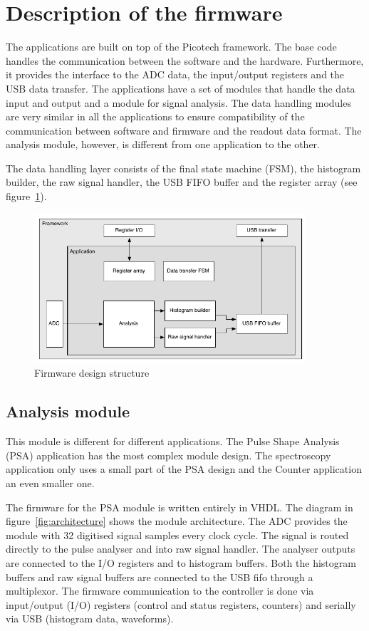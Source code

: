 \documentclass[12pt]{packages/mytustyle}  %
\begin{document}
\section{Description of the firmware}
The applications are built on top of the Picotech framework. The base code handles the communication between the software and the hardware. Furthermore, it provides the interface to the ADC data, the input/output registers and the USB data transfer. The applications have a set of modules that handle the data input and output and a module for signal analysis. The data handling modules are very similar in all the applications to ensure compatibility of the communication between software and firmware and the readout data format. The analysis module, however, is different from one application to the other. 

The data handling layer consists of the final state machine (FSM), the histogram builder, the raw signal handler, the USB FIFO buffer and the register array (see figure~\ref{fig:application}). 


\begin{figure}[!t]
\centering
\includegraphics[width=0.9\textwidth]{plots/application}
\caption{Firmware design structure}
\label{fig:application}
\end{figure}


\subsection{Analysis module}
\label{subsec:algorithm}
This module is different for different applications. The Pulse Shape Analysis (PSA) application has the most complex module design. The spectroscopy application only uses a small part of the PSA design and the Counter application an even smaller one.

The firmware for the PSA module is written entirely in VHDL. The diagram in figure~\ref{fig:architecture} shows the module architecture. The ADC provides the module with 32 digitised signal samples every clock cycle. The signal is routed directly to the pulse analyser and into raw signal handler. The analyser outputs are connected to the I/O registers and to histogram buffers. Both the histogram buffers and raw signal buffers are connected to the USB fifo through a multiplexor. The firmware communication to the controller is done via input/output (I/O) registers (control and status registers, counters) and serially via USB (histogram data, waveforms). 
\end{document}
